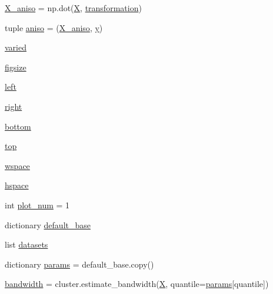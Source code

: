 \begin{DoxyCompactItemize}
\item 
\hyperlink{namespaceplot__cluster__comparison2_a7014448168271bf2f33b427d139fcc4f}{X\+\_\+aniso} = np.\+dot(\hyperlink{namespaceplot__cluster__comparison2_a8e252c334e74232a95e8cd3f77445dc4}{X}, \hyperlink{namespaceplot__cluster__comparison2_a2585f93108b8873ecdfdc02d2830c7c2}{transformation})
\item 
tuple \hyperlink{namespaceplot__cluster__comparison2_ac4bc843517d4ae9feb9a569a8bd95b3a}{aniso} = (\hyperlink{namespaceplot__cluster__comparison2_a7014448168271bf2f33b427d139fcc4f}{X\+\_\+aniso}, \hyperlink{namespaceplot__cluster__comparison2_afec14e7f171aedf7f79b22b85f0c60a1}{y})
\item 
\hyperlink{namespaceplot__cluster__comparison2_a8b8763833c1544180f6ba2b8d9d869a8}{varied}
\item 
\hyperlink{namespaceplot__cluster__comparison2_a457099a50edf0cc7fd7fbf8f74ae57df}{figsize}
\item 
\hyperlink{namespaceplot__cluster__comparison2_a802a36b6ed0b720d89637600b5cb90b0}{left}
\item 
\hyperlink{namespaceplot__cluster__comparison2_ab21d9650cf23bc2d88321c2df6cad67a}{right}
\item 
\hyperlink{namespaceplot__cluster__comparison2_ae8335db7df87091b4988a6bfbb3c4c1f}{bottom}
\item 
\hyperlink{namespaceplot__cluster__comparison2_a7fe1857e8bd9cd0976f07c9850b0cf97}{top}
\item 
\hyperlink{namespaceplot__cluster__comparison2_abf9f9bec73943e1bc8342d3e8d251694}{wspace}
\item 
\hyperlink{namespaceplot__cluster__comparison2_a349110b7a4a412d457b4a53f3f50b945}{hspace}
\item 
int \hyperlink{namespaceplot__cluster__comparison2_ab8147a1c2c1d5b43b74b6dfd54b28202}{plot\+\_\+num} = 1
\item 
dictionary \hyperlink{namespaceplot__cluster__comparison2_af59a10b0d3989f1278dcb9cd28a53903}{default\+\_\+base}
\item 
list \hyperlink{namespaceplot__cluster__comparison2_a06c054f3acb1962d259e2946bf3f651a}{datasets}
\item 
dictionary \hyperlink{namespaceplot__cluster__comparison2_a2c45c06ff9f589e117a4d45eca4dd71d}{params} = default\+\_\+base.\+copy()
\item 
\hyperlink{namespaceplot__cluster__comparison2_ab2526583a76a661571cb08639d3b4125}{bandwidth} = cluster.\+estimate\+\_\+bandwidth(\hyperlink{namespaceplot__cluster__comparison2_a8e252c334e74232a95e8cd3f77445dc4}{X}, quantile=\hyperlink{namespaceplot__cluster__comparison2_a2c45c06ff9f589e117a4d45eca4dd71d}{params}\mbox{[}\textquotesingle{}quantile\textquotesingle{}\mbox{]})

\end{DoxyCompactItemize}
